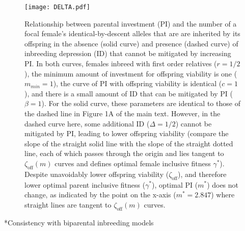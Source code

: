 \documentclass[12pt]{article}
\makeatletter
\renewcommand\section{\@startsection{section}{1}{0in}{-0.5\baselineskip}{0.1\baselineskip}{\normalfont\large\bfseries}}
\makeatother
\begin{document}
\begin{figure}
\begin{center}				
\texttt{[image: DELTA.pdf]}
\end{center}
\caption{Relationship between parental investment (PI) and the number of a focal female's identical-by-descent alleles that are are inherited by its offspring in the absence (solid curve) and presence (dashed curve) of inbreeding depression (ID) that cannot be mitigated by increasing PI. In both curves, females inbreed with first order relatives ($r=1/2$), the minimum amount of investment for offspring viability is one ($m_{min}=1$), the curve of PI with offspring viability is identical ($c=1$), and there is a small amount of ID that can be mitigated by PI ($\beta=1$). For the solid curve, these parameters are identical to those of the dashed line in Figure 1A of the main text. However, in the dashed curve here, some additional ID ($\Delta=1/2$) cannot be mitigated by PI, leading to lower offspring viability (compare the slope of the straight solid line with the slope of the straight dotted line, each of which passes through the origin and lies tangent to $\zeta_{\textrm{off}}(m)$ curves and defines optimal female inclusive fitness $\gamma^{*}$). Despite unavoidably lower offspring viability ($\zeta_{\textrm{off}}$), and therefore lower optimal parent inclusive fitness ($\gamma^{*}$), optimal PI ($m^{*}$) does not change, as indicated by the point on the x-axis ($m^{*}=2.847$) where straight lines are tangent to $\zeta_{\textrm{off}}(m)$ curves.}
\label{DELTA}
\end{figure}

\clearpage

\section*{Consistency with biparental inbreeding models}
\end{document}
